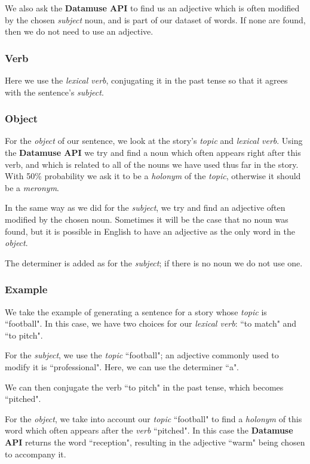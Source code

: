 We also ask the \textbf{Datamuse API} to find us an adjective which is often modified by the chosen \textit{subject} noun, and is part of our dataset of words. If none are found, then we do not need to use an adjective.

\subsubsection{Verb}

Here we use the \textit{lexical verb}, conjugating it in the past tense so that it agrees with the sentence's \textit{subject}.

\subsubsection{Object}

For the \textit{object} of our sentence, we look at the story's \textit{topic} and \textit{lexical verb}. Using the \textbf{Datamuse API} we try and find a noun which often appears right after this verb, and which is related to all of the nouns we have used thus far in the story. With 50\% probability we ask it to be a \textit{holonym} of the \textit{topic}, otherwise it should be a \textit{meronym}.

In the same way as we did for the \textit{subject}, we try and find an adjective often modified by the chosen noun. Sometimes it will be the case that no noun was found, but it is possible in English to have an adjective as the only word in the \textit{object}.

The determiner is added as for the \textit{subject}; if there is no noun we do not use one.

\subsubsection{Example}

We take the example of generating a sentence for a story whose \textit{topic} is ``football". In this case, we have two choices for our \textit{lexical verb}: ``to match" and ``to pitch".

For the \textit{subject}, we use the \textit{topic} ``football"; an adjective commonly used to modify it is ``professional". Here, we can use the determiner ``a".

We can then conjugate the verb ``to pitch" in the past tense, which becomes ``pitched".

For the \textit{object}, we take into account our \textit{topic} ``football" to find a \textit{holonym} of this word which often appears after the \textit{verb} ``pitched". In this case the \textbf{Datamuse API} returns the word ``reception", resulting in the adjective ``warm" being chosen to accompany it.


